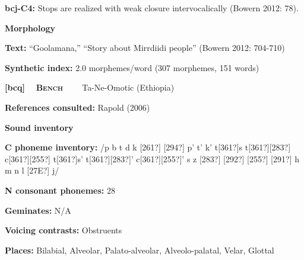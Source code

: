 \begin{styleBody}
\textbf{bcj-C4: }Stops are realized with weak closure intervocalically (Bowern 2012: 78).
\end{styleBody}

\begin{styleBody}
\textbf{Morphology}
\end{styleBody}

\begin{styleBody}
\textbf{Text:} “Goolamana,” “Story about Mirrdiidi people” (Bowern 2012: 704-710)
\end{styleBody}

\begin{styleBody}
\textbf{Synthetic index: }2.0 morphemes/word (307 morphemes, 151 words)
\end{styleBody}

\clearpage\begin{styleBody}
\textbf{[bcq] }\ \ \textbf{\textsc{Bench\ \ }}\textbf{\ \ }Ta-Ne-Omotic (Ethiopia)
\end{styleBody}

\begin{styleBody}
\textbf{References consulted: }Rapold (2006)
\end{styleBody}

\begin{styleBody}
\textbf{Sound inventory}
\end{styleBody}

\begin{styleBody}
\textbf{C phoneme inventory:} /p b t d k [261?] [294?] p’ t’ k’ t[361?]s t[361?][283?] c[361?][255?] t[361?]s’ t[361?][283?]’ c[361?][255?]’ s z [283?] [292?] [255?] [291?] h m n l [27E?] j/
\end{styleBody}

\begin{styleBody}
\textbf{N consonant phonemes:} 28
\end{styleBody}

\begin{styleBody}
\textbf{Geminates:} N/A
\end{styleBody}

\begin{styleBody}
\textbf{Voicing contrasts: }Obstruents
\end{styleBody}

\begin{styleBody}
\textbf{Places: }Bilabial, Alveolar, Palato-alveolar, Alveolo-palatal, Velar, Glottal
\end{styleBody}

